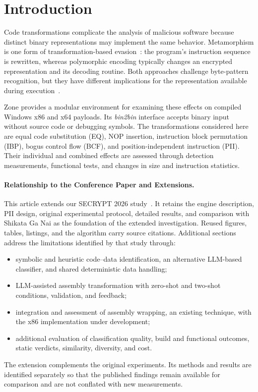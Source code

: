 \documentclass[runningheads]{llncs}
\begin{document}
\section{Introduction}\label{sec:introduction}

Code transformations complicate the analysis of malicious software because distinct binary representations may implement the same behavior. Metamorphism is one form of transformation-based evasion~\cite{PEsurveybible}: the program's instruction sequence is rewritten, whereas polymorphic encoding typically changes an encrypted representation and its decoding routine. Both approaches challenge byte-pattern recognition, but they have different implications for the representation available during execution~\cite{metamorphic1,metamorphic2}.

Zone provides a modular environment for examining these effects on compiled Windows x86 and x64 payloads. Its \emph{bin2bin} interface accepts binary input without source code or debugging symbols. The transformations considered here are equal code substitution (EQ), NOP insertion, instruction block permutation (IBP), bogus control flow (BCF), and position-independent instruction (PII). Their individual and combined effects are assessed through detection measurements, functional tests, and changes in size and instruction statistics.

\paragraph{Relationship to the Conference Paper and Extensions.}
This article extends our SECRYPT 2026 study~\cite{zone_secrypt_2026}.
It retains the engine description, PII design, original experimental
protocol, detailed results, and comparison with Shikata Ga Nai as the
foundation of the extended investigation. Reused figures, tables,
listings, and the algorithm carry source citations. Additional sections
address the limitations identified by that study through:
\begin{itemize}
\item symbolic and heuristic code--data identification, an alternative
LLM-based classifier, and shared deterministic data handling;
\item LLM-assisted assembly transformation with zero-shot and two-shot
conditions, validation, and feedback;
\item integration and assessment of assembly wrapping, an existing
technique, with the x86 implementation under development;
\item additional evaluation of classification quality, build and
functional outcomes, static verdicts, similarity, diversity, and cost.
\end{itemize}
The extension complements the original experiments. Its methods and
results are identified separately so that the published findings remain
available for comparison and are not conflated with new measurements.
\end{document}
